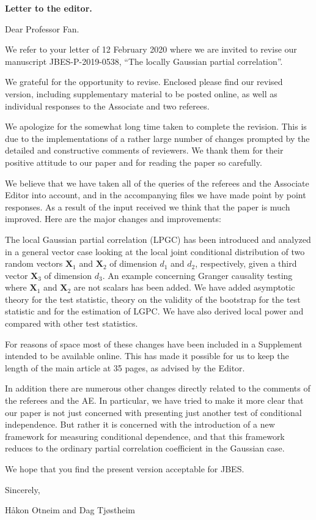 \documentclass[
  12pt,
  letterpaper]{article}
\author{}
\date{\vspace{-2.5em}}
\numberwithin{equation}{section}
\newcommand{\X}{\bm{X}}
\begin{document}
\noindent \textbf{Letter to the editor.}

\vspace{1cm}

\noindent Dear Professor Fan.

\vspace{1cm}

We refer to your letter of 12 February 2020 where we are invited to revise our manuscript JBES-P-2019-0538, ``The locally Gaussian partial correlation''.

We grateful for the opportunity to revise. Enclosed please find our revised version, including supplementary material to be posted online, as well as individual responses to the Associate and two referees.

We apologize for the somewhat long time taken to complete the revision. This is due to the implementations of a rather large number of changes prompted by the detailed and constructive comments of reviewers. We thank them for their positive attitude to our paper and for reading the paper so carefully.

We believe that we have taken all of the queries of the referees and the Associate Editor into account, and in the accompanying files we have made point by point responses. As a result of the input received we think that the paper is much improved. Here are the major changes and improvements:

The local Gaussian partial correlation (LPGC) has been introduced and analyzed in a general vector case looking at the local joint conditional distribution of two random vectors \(\X_1\) and \(\X_2\) of dimension \(d_1\) and \(d_2\), respectively, given a third vector \(\X_3\) of dimension \(d_3\). An example concerning Granger causality testing where \(\X_1\) and \(\X_2\) are not scalars has been added. We have added asymptotic theory for the test statistic, theory on the validity of the bootstrap for the test statistic and for the estimation of LGPC. We have also derived local power and compared with other test statistics.

For reasons of space most of these changes have been included in a Supplement intended to be available online. This has made it possible for us to keep the length of the main article at 35 pages, as advised by the Editor.

In addition there are numerous other changes directly related to the comments of the referees and the AE. In particular, we have tried to make it more clear that our paper is not just concerned with presenting just another test of conditional independence. But rather it is concerned with the introduction of a new framework for measuring conditional dependence, and that this framework reduces to the ordinary partial correlation coefficient in the Gaussian case.

We hope that you find the present version acceptable for JBES.

\vspace{.5cm}

Sincerely,

\vspace{.5cm}

Håkon Otneim and Dag Tjøstheim
\end{document}
